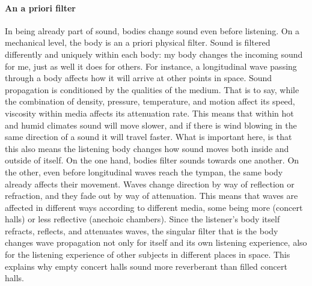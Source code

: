 \paragraph{An a priori filter}
In being already part of sound, bodies change sound even before listening. On a mechanical level, the body is an a priori physical filter. Sound is filtered differently and uniquely within each body: my body changes the incoming sound for me, just as well it does for others. For instance, a longitudinal wave passing through a body affects how it will arrive at other points in space. Sound propagation is conditioned by the qualities of the medium. That is to say, while the combination of density, pressure, temperature, and motion affect its speed, viscosity within media affects its attenuation rate. This means that within hot and humid climates sound will move slower, and if there is wind blowing in the same direction of a sound it will travel faster. What is important here, is that this also means the listening body changes how sound moves both inside and outside of itself. On the one hand, bodies filter sounds towards one another. On the other, even before longitudinal waves reach the tympan, the same body already affects their movement. Waves change direction by way of reflection or refraction, and they fade out by way of attenuation. This means that waves are affected in different ways according to different media, some being more (concert halls) or less reflective (anechoic chambers). Since the listener's body itself refracts, reflects, and attenuates waves, the singular filter that is the body changes wave propagation not only for itself and its own listening experience, also for the listening experience of other subjects in different places in space. This explains why empty concert halls sound more reverberant than filled concert halls.

